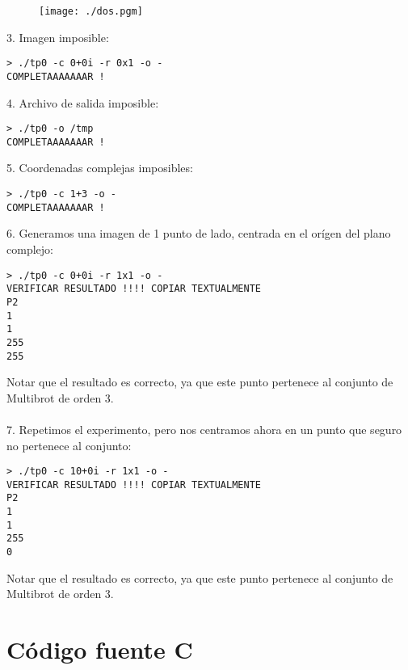 \documentclass[a4paper,10pt]{article}
\begin{document}
\begin{figure}
\begin{center}
\texttt{[image: ./dos.pgm]}
\label{fig:Region comprendida entre -0.625+0.625i y -0.575+0.575i.}
\caption{}
\end{center}
\end{figure}

3. Imagen imposible:
\begin{verbatim}
> ./tp0 -c 0+0i -r 0x1 -o -
COMPLETAAAAAAAR !
\end{verbatim}

4. Archivo de salida imposible:
\begin{verbatim}
> ./tp0 -o /tmp
COMPLETAAAAAAAR !
\end{verbatim}

5. Coordenadas complejas imposibles:
\begin{verbatim}
> ./tp0 -c 1+3 -o -
COMPLETAAAAAAAR !
\end{verbatim}

6. Generamos una imagen de 1 punto de lado, centrada en el or\'igen del plano complejo:
\begin{verbatim}
> ./tp0 -c 0+0i -r 1x1 -o -
VERIFICAR RESULTADO !!!! COPIAR TEXTUALMENTE
P2
1
1
255
255
\end{verbatim}

Notar que el resultado es correcto, ya que este punto pertenece al conjunto de Multibrot de orden 3.\\
\\

7. Repetimos el experimento, pero nos centramos ahora en un punto que seguro no pertenece
al conjunto:
\begin{verbatim}
> ./tp0 -c 10+0i -r 1x1 -o -
VERIFICAR RESULTADO !!!! COPIAR TEXTUALMENTE
P2
1
1
255
0
\end{verbatim}

Notar que el resultado es correcto, ya que este punto pertenece al conjunto de Multibrot de orden 3.
\\



\section{C\'odigo fuente C}
\end{document}
